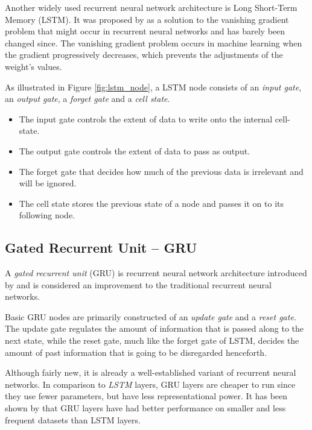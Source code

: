 \documentclass[nofilelist]{cslthse-msc}
\begin{document}
Another widely used recurrent neural network architecture is Long Short-Term Memory (LSTM). It was proposed by \citet{hochreiter1997} as a solution to the vanishing gradient problem that might occur in recurrent neural networks and has barely been changed since. The vanishing gradient problem occurs in machine learning when the gradient progressively decreases, which prevents the adjustments of the weight's values. 


As illustrated in Figure \ref{fig:lstm_node}, a LSTM node consists of an \textit{input gate}, an \textit{output gate}, a \textit{forget gate} and a \textit{cell state}. 
\begin{itemize}
    \item The input gate controls the extent of data to write onto the internal cell-state.
    \item The output gate controls the extent of data to pass as output. 
    \item The forget gate that decides how much of the previous data is irrelevant and will be ignored. 
    \item The cell state stores the previous state of a node and passes it on to its following node. 
\end{itemize}




\subsection{Gated Recurrent Unit -- GRU}
A \emph{gated recurrent unit} (GRU) is recurrent neural network architecture introduced by \citet{cho2014learning} and is considered an improvement to the traditional recurrent neural networks. 

Basic GRU nodes  are primarily constructed of an \textit{update gate} and a \textit{reset gate}. The update gate regulates the amount of information that is passed along to the next state, while the reset gate, much like the forget gate of LSTM, decides the amount of past information that is going to be disregarded henceforth. 

Although fairly new, it is already a well-established variant of recurrent neural networks. In comparison to \textit{LSTM} layers, GRU layers are cheaper to run since they use fewer parameters, but have less representational power. It has been shown by \citet{Gruber2020AreGC} that GRU layers have had better performance on smaller and less frequent datasets than LSTM layers.
\end{document}
